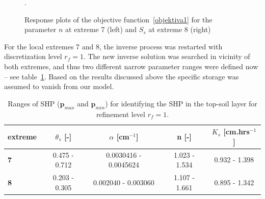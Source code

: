 \documentclass[review,times,3p,10pt]{elsarticle}
\renewcommand{\vec}{\mathbf}
\newcommand{\fs}{\footnotesize}
\begin{document}
\begin{figure}
\caption{Response plots of the objective function~\eqref{objektiva1} for the parameter $n$ at extreme 7 (left)  and $S_s$ at extreme 8  (right)}.
\label{objfnc6.2}
\end{figure}

For the local extremes 7 and 8, the inverse process was restarted with discretization level $r_f=1$. 
The new inverse solution was searched in  vicinity of both extremes, and thus two different narrow parameter ranges were defined now -- see table~\ref{rozsahy2}. Based on the results discussed above the specific storage was assumed to vanish from our model. 


\begin{table}[ht]
\begin{center}
\caption{Ranges of SHP ($\vec{p}_{max}$ and $\vec{p}_{min}$) for identifying the SHP in the top-soil layer for { refinement level} $r_f=1$. }
\fs
\begin{tabular}{ l || c | c| c| c }
\toprule
extreme & $\theta_s$ [-]&$\alpha$ [cm$^{-1}$]&n [-]& $K_s$ [cm.hrs$^{-1}$]  \\ \hline
\toprule
{\bf 7} & 0.475 - 0.712 & \num{.0030416} - \num{.0045624} & 1.023 - 1.534 & 0.932 - 1.398 \\
{\bf 8} & 0.203 - 0.305 & \num{.002040} - \num{.003060} & 1.107 - 1.661 & 0.895 - 1.342  \\
\toprule
\end{tabular}
\label{rozsahy2}
\end{center}
\end{table}
\end{document}
